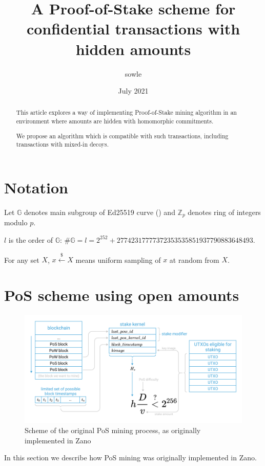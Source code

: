 \documentclass{article}
\title{\huge{\textbf{A Proof-of-Stake scheme for confidential transactions with hidden amounts}}}
\author{\large{sowle}}
\affil{\small{Zano project \\ \texttt{val@zano.org} \\ \url{https://zano.org}}}
\date{\small{July 2021}}
\numberwithin{figure}{section}
\begin{document}
\maketitle

\begin{abstract}
This article explores a way of implementing Proof-of-Stake mining algorithm in an environment where amounts are hidden with homomorphic commitments.

We propose an algorithm which is compatible with such transactions, including transactions with mixed-in decoys.
\end{abstract}

\section{Notation}
Let $\mathbb{G}$ denotes main subgroup of Ed25519 curve (\cite{ed25519_site}) and $\mathbb{Z}_p$ denotes ring of integers modulo $p$.

$l$ is the order of $\mathbb{G}$: $\#\mathbb{G} = l = 2^{252} + 27742317777372353535851937790883648493$.

For  any  set $X$, $x \stackrel{\$}{\leftarrow} X$ means uniform  sampling of $x$ at random from $X$. 



\section{PoS scheme using open amounts} \label{sec_open_amounts}

\begin{figure}[ht!]
\centering
\includegraphics[scale=0.665]{fig_1.png}
\caption{Scheme of the original PoS mining process, as originally implemented in Zano}
\label{fig:1.1}
\end{figure}

\indent
In this section we describe how PoS mining was originally implemented in Zano.
\end{document}
